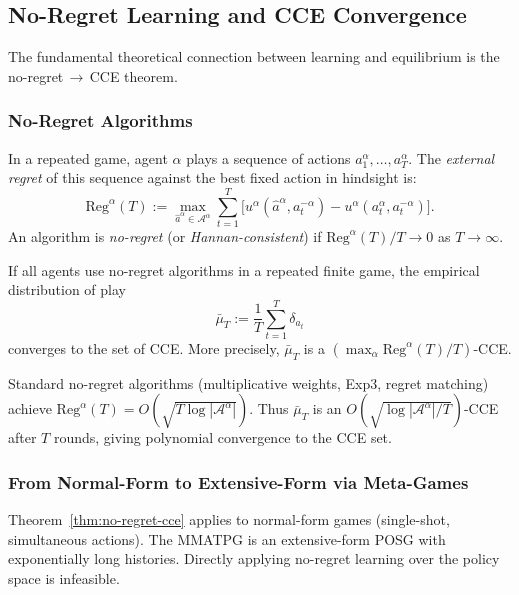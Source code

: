 \subsection{No-Regret Learning and CCE Convergence}\label{sec:no-regret}

The fundamental theoretical connection between learning and equilibrium is the no-regret$\,\to\,$CCE theorem.


\subsubsection{No-Regret Algorithms}

\begin{definition}
In a repeated game, agent $\alpha$ plays a sequence of actions $a^\alpha_1,\ldots,a^\alpha_T$. The \emph{external regret} of this sequence against the best fixed action in hindsight is:
\[
\mathrm{Reg}^\alpha(T) := \max_{\hat a^\alpha\in\mathcal{A}^\alpha} \sum_{t=1}^T \big[u^\alpha(\hat a^\alpha, a^{-\alpha}_t) - u^\alpha(a^\alpha_t, a^{-\alpha}_t)\big].
\]
An algorithm is \emph{no-regret} (or \emph{Hannan-consistent}) if $\mathrm{Reg}^\alpha(T)/T \to 0$ as $T\to\infty$.
\end{definition}

\begin{theorem}\label{thm:no-regret-cce}
If all agents use no-regret algorithms in a repeated finite game, the empirical distribution of play
\[
\bar\mu_T := \frac{1}{T}\sum_{t=1}^T \delta_{a_t}
\]
converges to the set of CCE. More precisely, $\bar\mu_T$ is a $(\max_\alpha \mathrm{Reg}^\alpha(T)/T)$-CCE.
\end{theorem}

\begin{remark}
Standard no-regret algorithms (multiplicative weights, Exp3, regret matching) achieve $\mathrm{Reg}^\alpha(T) = O(\sqrt{T\log|\mathcal{A}^\alpha|})$. Thus $\bar\mu_T$ is an $O(\sqrt{\log|\mathcal{A}^\alpha|/T})$-CCE after $T$ rounds, giving polynomial convergence to the CCE set.
\end{remark}


\subsubsection{From Normal-Form to Extensive-Form via Meta-Games}

Theorem~\ref{thm:no-regret-cce} applies to normal-form games (single-shot, simultaneous actions). The MMATPG is an extensive-form POSG with exponentially long histories. Directly applying no-regret learning over the policy space is infeasible.

